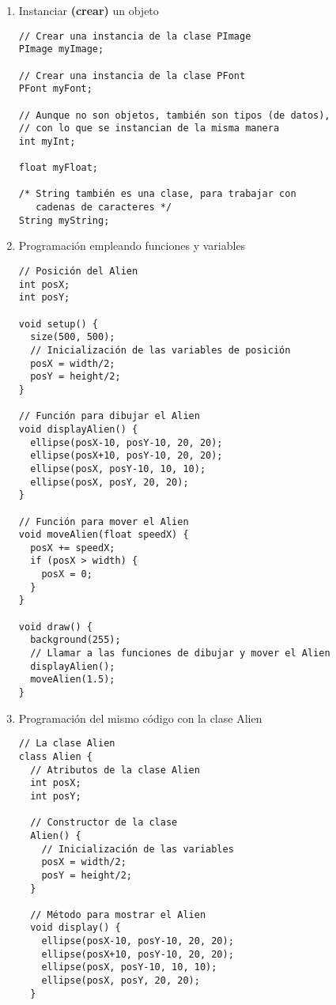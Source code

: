 \documentclass[a4paper,oneside]{article}
\begin{document}
\begin{enumerate}

  \item Instanciar \textbf{(crear)} un objeto

    \begin{verbatim}
// Crear una instancia de la clase PImage
PImage myImage;

// Crear una instancia de la clase PFont
PFont myFont;

// Aunque no son objetos, también son tipos (de datos),
// con lo que se instancian de la misma manera
int myInt;

float myFloat;

/* String también es una clase, para trabajar con
   cadenas de caracteres */
String myString;

    \end{verbatim}

\newpage
  \item Programación empleando funciones y variables

    \begin{verbatim}
// Posición del Alien
int posX;
int posY;

void setup() {
  size(500, 500);
  // Inicialización de las variables de posición
  posX = width/2;
  posY = height/2;
}

// Función para dibujar el Alien
void displayAlien() {
  ellipse(posX-10, posY-10, 20, 20);
  ellipse(posX+10, posY-10, 20, 20);
  ellipse(posX, posY-10, 10, 10);
  ellipse(posX, posY, 20, 20);
}

// Función para mover el Alien
void moveAlien(float speedX) {
  posX += speedX;
  if (posX > width) {
    posX = 0;
  }
}

void draw() {
  background(255);
  // Llamar a las funciones de dibujar y mover el Alien
  displayAlien();
  moveAlien(1.5);
}
    \end{verbatim}

\newpage
  \item Programación del mismo código con la clase Alien

    \begin{verbatim}
// La clase Alien
class Alien {
  // Atributos de la clase Alien
  int posX;
  int posY;

  // Constructor de la clase
  Alien() {
    // Inicialización de las variables
    posX = width/2;
    posY = height/2;
  }

  // Método para mostrar el Alien
  void display() {
    ellipse(posX-10, posY-10, 20, 20);
    ellipse(posX+10, posY-10, 20, 20);
    ellipse(posX, posY-10, 10, 10);
    ellipse(posX, posY, 20, 20);
  }
  

\end{verbatim}
\end{enumerate}
\end{document}
